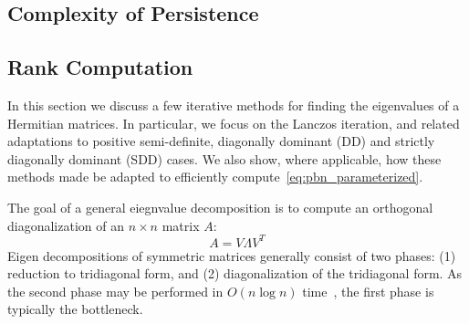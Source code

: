 \documentclass[10pt]{article}
\newcommand{\+}{%
	\raisebox{0.18ex}{\scaleobj{0.55}{+}}
}
\theoremstyle{definition}
\begin{document}

\subsection{Complexity of Persistence}


\subsection{Rank Computation}
In this section we discuss a few iterative methods for finding the eigenvalues of a Hermitian matrices. In particular, we focus on the Lanczos iteration, and related adaptations to positive semi-definite, diagonally dominant (DD) and strictly diagonally dominant (SDD) cases. We also show, where applicable, how these methods made be adapted to efficiently compute~\eqref{eq:pbn_parameterized}.

The goal of a general eiegnvalue decomposition is to compute an orthogonal diagonalization of an $n \times n $ matrix $A$:
\begin{equation}
	A = V \Lambda V^T
\end{equation}
Eigen decompositions of symmetric matrices generally consist of two phases: (1) reduction to tridiagonal form, and (2) diagonalization of the tridiagonal form. As the second phase may be performed in $O(n \log n)$ time~\cite{gu1995divide}, the first phase is typically the bottleneck. 


 
\end{document}
